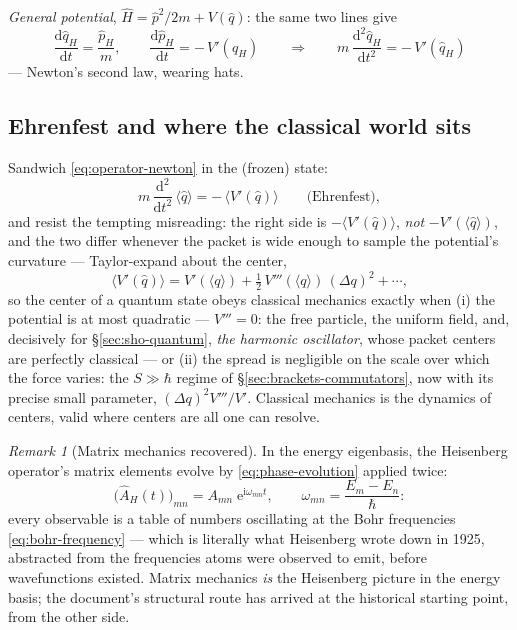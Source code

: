 \documentclass[11pt]{article}
\theoremstyle{plain}
\theoremstyle{definition}
\theoremstyle{remark}
\newtheorem{remark}[theorem]{Remark}
\newcommand{\dd}{\mathrm{d}}
\newcommand{\ee}{\mathrm{e}}
\newcommand{\ii}{\mathrm{i}}
\newcommand{\tot}[2]{\frac{\dd #1}{\dd #2}}
\newcommand{\op}[1]{\hat{#1}}
\begin{document}
\emph{General potential}, $\op H = \op p^2/2m + V(\op q)$: the same
two lines give
\begin{equation}
  \tot{\op q_H}t = \frac{\op p_H}m,
  \qquad
  \tot{\op p_H}t = -\,V'(\op q_H)
  \qquad\Longrightarrow\qquad
  m\,\frac{\dd^2\op q_H}{\dd t^2} = -\,V'(\op q_H)
  \label{eq:operator-newton}
\end{equation}
--- Newton's second law, wearing hats.

\subsection{Ehrenfest and where the classical world sits}
\label{sec:ehrenfest}

Sandwich \eqref{eq:operator-newton} in the (frozen) state:
\begin{equation}
  m\,\frac{\dd^2}{\dd t^2}\,\langle\op q\rangle
  = -\,\bigl\langle V'(\op q)\bigr\rangle
  \qquad\text{(Ehrenfest)},
  \label{eq:ehrenfest}
\end{equation}
and resist the tempting misreading: the right side is
$-\langle V'(\op q)\rangle$, \emph{not} $-V'(\langle\op q\rangle)$,
and the two differ whenever the packet is wide enough to sample the
potential's curvature --- Taylor-expand about the center,
\begin{equation}
  \bigl\langle V'(\op q)\bigr\rangle
  = V'(\langle q\rangle)
  + \tfrac12\,V'''(\langle q\rangle)\,(\Delta q)^2 + \cdots ,
\end{equation}
so the center of a quantum state obeys classical mechanics exactly
when (i) the potential is at most quadratic --- $V''' = 0$: the free
particle, the uniform field, and, decisively for
\S\ref{sec:sho-quantum}, \emph{the harmonic oscillator}, whose
packet centers are perfectly classical --- or (ii) the spread is
negligible on the scale over which the force varies: the
$S \gg \hbar$ regime of \S\ref{sec:brackets-commutators}, now with
its precise small parameter, $(\Delta q)^2 V'''/V'$. Classical
mechanics is the dynamics of centers, valid where centers are all
one can resolve.

\begin{remark}[Matrix mechanics recovered]
\label{rem:matrix-mechanics}
In the energy eigenbasis, the Heisenberg operator's matrix elements
evolve by \eqref{eq:phase-evolution} applied twice:
\begin{equation}
  \bigl(\op A_H(t)\bigr)_{mn}
  = A_{mn}\;\ee^{\ii\omega_{mn} t},
  \qquad
  \omega_{mn} = \frac{E_m - E_n}{\hbar} :
\end{equation}
every observable is a table of numbers oscillating at the Bohr
frequencies \eqref{eq:bohr-frequency} --- which is literally what
Heisenberg wrote down in 1925, abstracted from the frequencies
atoms were observed to emit, before wavefunctions existed. Matrix
mechanics \emph{is} the Heisenberg picture in the energy basis; the
document's structural route has arrived at the historical starting
point, from the other side.
\end{remark}
\end{document}
